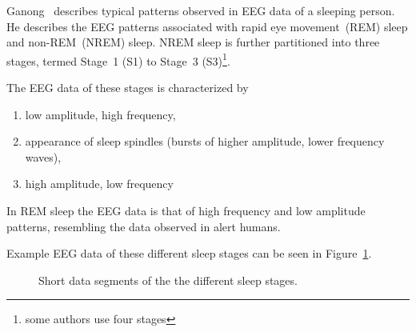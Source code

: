 Ganong~\cite[chapter~11]{Ganong1997} describes typical patterns observed in EEG data of a sleeping person. He describes the EEG patterns associated with rapid eye movement~(REM) sleep and non-REM~(NREM) sleep. NREM sleep is further partitioned into three stages, termed Stage~1 (S1) to Stage~3 (S3)\footnote{some authors use four stages}. 

\newpage
The EEG data of these stages is characterized by

\begin{enumerate}[label={S\arabic*:}]
	\item low amplitude, high frequency,
	\item appearance of sleep spindles (bursts of higher amplitude, lower frequency waves),
	\item high amplitude, low frequency
\end{enumerate}

In REM sleep the EEG data is that of high frequency and low amplitude patterns, resembling the data observed in alert humans.

Example EEG data of these different sleep stages can be seen in Figure~\ref{fig:different_sleep_stages}.

\begin{figure}
	\centering

	\begin{subfigure}[b]{\textwidth}
	\end{subfigure}
	
	\caption{Short data segments of the the different sleep stages.}
	\label{fig:different_sleep_stages}
\end{figure}
